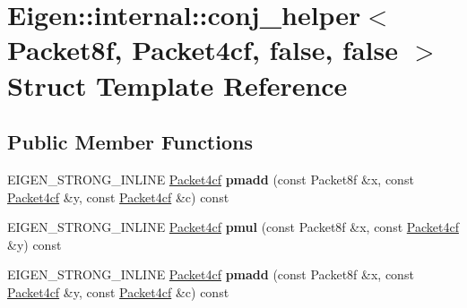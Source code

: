 \hypertarget{struct_eigen_1_1internal_1_1conj__helper_3_01_packet8f_00_01_packet4cf_00_01false_00_01false_01_4}{}\section{Eigen\+:\+:internal\+:\+:conj\+\_\+helper$<$ Packet8f, Packet4cf, false, false $>$ Struct Template Reference}
\label{struct_eigen_1_1internal_1_1conj__helper_3_01_packet8f_00_01_packet4cf_00_01false_00_01false_01_4}
\subsection*{Public Member Functions}
\begin{DoxyCompactItemize}
\item 
\mbox{\label{struct_eigen_1_1internal_1_1conj__helper_3_01_packet8f_00_01_packet4cf_00_01false_00_01false_01_4_a0f5cba34f084c12244deb2480e8119ac}} 
E\+I\+G\+E\+N\+\_\+\+S\+T\+R\+O\+N\+G\+\_\+\+I\+N\+L\+I\+NE \hyperlink{struct_eigen_1_1internal_1_1_packet4cf}{Packet4cf} {\bfseries pmadd} (const Packet8f \&x, const \hyperlink{struct_eigen_1_1internal_1_1_packet4cf}{Packet4cf} \&y, const \hyperlink{struct_eigen_1_1internal_1_1_packet4cf}{Packet4cf} \&c) const
\item 
\mbox{\label{struct_eigen_1_1internal_1_1conj__helper_3_01_packet8f_00_01_packet4cf_00_01false_00_01false_01_4_af1695348ea377eae0928a5d102e9fa73}} 
E\+I\+G\+E\+N\+\_\+\+S\+T\+R\+O\+N\+G\+\_\+\+I\+N\+L\+I\+NE \hyperlink{struct_eigen_1_1internal_1_1_packet4cf}{Packet4cf} {\bfseries pmul} (const Packet8f \&x, const \hyperlink{struct_eigen_1_1internal_1_1_packet4cf}{Packet4cf} \&y) const
\item 
\mbox{\label{struct_eigen_1_1internal_1_1conj__helper_3_01_packet8f_00_01_packet4cf_00_01false_00_01false_01_4_a0f5cba34f084c12244deb2480e8119ac}} 
E\+I\+G\+E\+N\+\_\+\+S\+T\+R\+O\+N\+G\+\_\+\+I\+N\+L\+I\+NE \hyperlink{struct_eigen_1_1internal_1_1_packet4cf}{Packet4cf} {\bfseries pmadd} (const Packet8f \&x, const \hyperlink{struct_eigen_1_1internal_1_1_packet4cf}{Packet4cf} \&y, const \hyperlink{struct_eigen_1_1internal_1_1_packet4cf}{Packet4cf} \&c) const

\end{DoxyCompactItemize}
